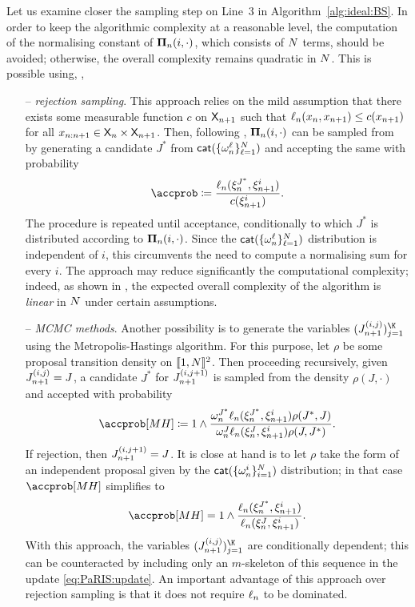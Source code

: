 Let us examine closer the sampling step on Line~3 in Algorithm~\ref{alg:ideal:BS}. 
In order to keep the algorithmic complexity at a reasonable level, the computation of the normalising constant of $\boldsymbol{\Pi}_{n}(i, \cdot)$, which consists of $N$ terms, should be avoided; otherwise, the overall complexity remains quadratic in $N$. This is possible using, \eg,   
\begin{itemize}
\item[--] \emph{rejection sampling}. This approach relies on the mild assumption that there exists some measurable function $c$ on $\mathsf{X}_{n + 1}$ such that $\ell_{n}(x_n, x_{n + 1}) \leq c(x_{n + 1})$ for all $x_{n: n + 1} \in \mathsf{X}_n \times \mathsf{X}_{n + 1}$. Then, following \cite{douc:garivier:moulines:olsson:2010}, $\boldsymbol{\Pi}_{n}(i, \cdot)$ can be sampled from by generating a candidate $J^\ast$ from $\mathsf{cat}(\{ \omega_{n}^{\ell}\}_{\ell = 1}^N)$ and accepting the same with probability 
\begin{equation} \label{eq:std:acc:prob:backward:sampling}
\accprob \eqdef \frac{\ud{n}(\epart{n}{J^\ast}, \epart{n + 1}{i})}{c(\epart{n + 1}{i})}. 
\end{equation}
The procedure is repeated until acceptance, conditionally to which $J^\ast$ is distributed according to $\boldsymbol{\Pi}_{n}(i, \cdot)$. Since the $\mathsf{cat}(\{ \omega_{n}^{\ell}\}_{\ell = 1}^N)$ distribution is independent of $i$, this circumvents the need to compute a normalising sum for every $i$. The approach may reduce significantly the computational complexity; indeed, as shown in \cite[Proposition~2]{douc:garivier:moulines:olsson:2010}, the expected overall complexity of the algorithm is \emph{linear} in $N$ under certain assumptions.   
\item[--] \emph{MCMC methods}. Another possibility is to generate the variables $(\bi{n + 1}{i}{j})_{j = 1}^{\K}$ using the Metropolis-Hastings algorithm. For this purpose, let $\rho$ be some proposal transition density on $\llbracket 1, N \rrbracket^2$. Then proceeding recursively, given $J_{n + 1}^{(i, j)} = J$, a candidate $J^\ast$ for $J_{n + 1}^{(i, j + 1)}$ is sampled from the density $\rho(J, \cdot)$ and accepted with probability 
$$
\accprob[MH] \eqdef 1 \wedge\frac{\ewght{n}{J^\ast} \ud{n}(\epart{n}{J^\ast}, \epart{n + 1}{i}) \rho(J^\ast, J)}{\ewght{n}{J} \ud{n}(\epart{n}{J}, \epart{n + 1}{i}) \rho(J, J^\ast)}. 
$$ 
If rejection, then $J_{n + 1}^{(i, j + 1)} = J$. It is close at hand is to let $\rho$ take the form of an independent proposal given by the $\mathsf{cat}(\{ \omega_{n}^{i} \}_{i = 1}^N)$ distribution; in that case $\accprob[MH]$ simplifies to  
\begin{equation} \label{eq:std:MH:prob:backward:sampling}
\accprob[MH] = 1 \wedge \frac{\ud{n}(\epart{n}{J^\ast}, \epart{n + 1}{i})}{\ud{n}(\epart{n}{J}, \epart{n + 1}{i})}. 
\end{equation}
With this approach, the variables $(\bi{n + 1}{i}{j})_{j = 1}^{\K}$ are conditionally dependent; this can be counteracted by including only an $m$-skeleton of this sequence in the update \eqref{eq:PaRIS:update}. An important advantage of this approach over rejection sampling is that it does not require $\ell_{n}$ to be dominated.  
\end{itemize}


